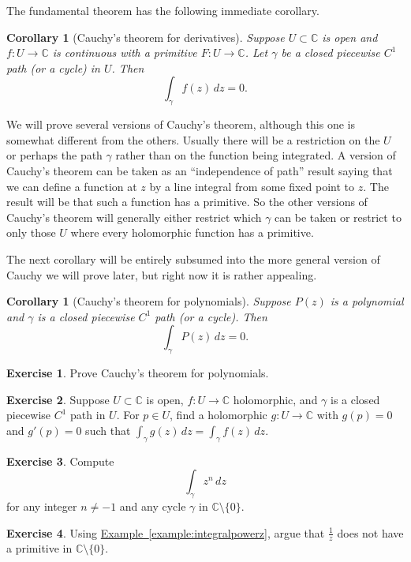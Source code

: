 \documentclass[12pt,openany]{book}
\newcommand{\C}{{\mathbb{C}}}
\theoremstyle{plain}
\newtheorem{cor}[thm]{Corollary}
\theoremstyle{remark}
\theoremstyle{definition}
\newenvironment{exbox}{%
    \def\FrameCommand{\vrule width 1pt \relax\hspace{10pt}}%
    \MakeFramed{\advance\hsize-\width\FrameRestore}%
}{%
    \endMakeFramed
}
\theoremstyle{exercise}
\newtheorem{exercise}{Exercise}[section]
\theoremstyle{example}
\newcommand{\exampleref}[1]{\hyperref[#1]{Example~\ref*{#1}}}
\begin{document}
The fundamental theorem has the following
immediate corollary.

\begin{cor}[Cauchy's theorem for derivatives] \label{cor:cauchyforders}
Suppose $U \subset \C$ is open and $f \colon U \to \C$
is continuous with a primitive
$F \colon U \to \C$.
Let $\gamma$ be a closed piecewise $C^1$ path (or a cycle) in $U$.
Then
\begin{equation*}
\int_\gamma f(z) \, dz = 0 .
\end{equation*}
\end{cor}

We will prove several versions of Cauchy's theorem, although this one is
somewhat different from the others.  Usually there will be a restriction on
the $U$ or perhaps the path $\gamma$ rather
than on the function being integrated.
A version of Cauchy's theorem can be taken as an ``independence of path''
result saying that we can define a function at $z$ by a line integral
from some fixed point to $z$.  The result will be that such a function has a
primitive.  So the other versions of Cauchy's theorem will generally
either restrict which $\gamma$ can be taken or
restrict to only those $U$ where every holomorphic function has a primitive.

The next corollary will be entirely
subsumed into the more general version of Cauchy we will prove later,
but right now it is rather appealing.

\begin{cor}[Cauchy's theorem for polynomials]
Suppose $P(z)$ is a polynomial and $\gamma$ is a closed
piecewise $C^1$ path (or a cycle).  Then
\begin{equation*}
\int_\gamma P(z) \, dz = 0 .
\end{equation*}
\end{cor}

\begin{exbox}
\begin{exercise}
Prove Cauchy's theorem for polynomials.
\end{exercise}

\begin{exercise}
Suppose $U \subset \C$ is open, $f \colon U \to \C$ holomorphic, and
$\gamma$ is a closed piecewise $C^1$ path in $U$.  
For $p \in U$, find a holomorphic $g \colon U \to \C$ with $g(p) = 0$
and $g'(p) = 0$ such that $\int_\gamma g(z)\, dz = \int_\gamma f(z) \, dz$.
\end{exercise}

\begin{exercise}
Compute
\begin{equation*}
\int_\gamma z^n \, dz
\end{equation*}
for any integer $n \not= -1$ and any cycle $\gamma$ in
$\C \setminus \{ 0 \}$.
\end{exercise}

\begin{exercise}
Using \exampleref{example:integralpowerz}, argue that $\frac{1}{z}$ does
not have a primitive in $\C \setminus \{ 0 \}$.
\end{exercise}
\end{exbox}
\end{document}
